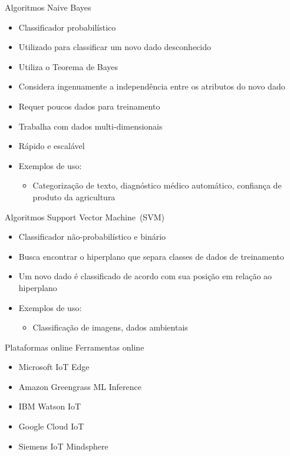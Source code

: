 \documentclass[t]{beamer}
\begin{document}
\begin{frame}{Algoritmos}
Naive Bayes
\begin{itemize}
	\item Classificador probabilístico
	\item Utilizado para classificar um novo dado desconhecido
	\item Utiliza o Teorema de Bayes
	\item Considera ingenuamente a independência entre os atributos do novo dado
	\item Requer poucos dados para treinamento
	\item Trabalha com dados multi-dimensionais
	\item Rápido e escalável
	\item Exemplos de uso:
	\begin{itemize}
		\item Categorização de texto, diagnóstico médico automático, confiança de produto da agricultura
	\end{itemize}
\end{itemize}
\end{frame}

\begin{frame}{Algoritmos}
Support Vector Machine~(SVM)
\begin{itemize}
	\item Classificador não-probabilístico e binário
	\item Busca encontrar o hiperplano que separa classes de dados de treinamento
	\item Um novo dado é classificado de acordo com sua posição em relação ao hiperplano
	\item Exemplos de uso:
	\begin{itemize}
		\item Classificação de imagens, dados ambientais
	\end{itemize}
\end{itemize}
\end{frame}

\begin{frame}{Plataformas online}
Ferramentas online
\begin{itemize}
	\item Microsoft IoT Edge
	\item Amazon Greengrass ML Inference
	\item IBM Watson IoT
	\item Google Cloud IoT
	\item Siemens IoT Mindsphere
\end{itemize}
\end{frame}

\frame{\titlepage}
\end{document}
